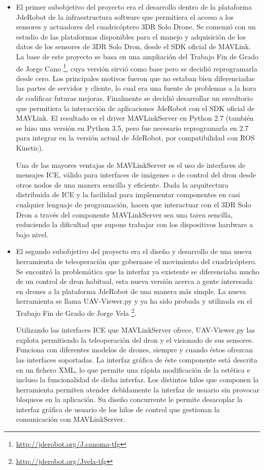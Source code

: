 \begin{itemize}
\item El primer subobjetivo del proyecto era el desarrollo dentro de la plataforma JdeRobot de la infraestructura software que permitiera el acceso a los sensores y actuadores del cuadricóptero 3DR Solo Drone. Se comenzó con un estudio de las plataformas disponibles para el manejo y adquisición de los datos de los sensores de 3DR Solo Dron, desde el SDK oficial de MAVLink. La base de este proyecto se basa en una ampliación del Trabajo Fin de Grado de Jorge Cano \footnote{\url{http://jderobot.org/J.canoma-tfg}}, cuya versión sirvió como base pero se decidió reprogramarla desde cero. Los principales motivos fueron que no estaban bien diferenciadas las partes de servidor y cliente, lo cual era una fuente de problemas a la hora de codificar futuras mejoras. Finalmente se decidió desarrollar un envoltorio que permitiera la interacción de aplicaciones JdeRobot con el SDK oficial de MAVLink. El resultado es el driver MAVLinkServer en Python 2.7 (también se hizo una versión en Python 3.5, pero fue necesario reprogramarla en 2.7 para integrar en la versión actual de JdeRobot, por compatibilidad con ROS Kinetic). 

Una de las mayores ventajas de MAVLinkServer es el uso de interfaces de mensajes ICE, válido para interfaces de imágenes o de control del dron desde otros nodos de una manera sencilla y eficiente. Dada la arquitectura distribuida de ICE y la facilidad para implementar componentes en casi cualquier lenguaje de programación, hacen que interactuar con el 3DR Solo Dron a través del componente MAVLinkServer sea una tarea sencilla, reduciendo la dificultad que supone trabajar con los dispositivos hardware a bajo nivel.

\item El segundo subobjetivo del proyecto era el diseño y desarrollo de una nueva herramienta de teleoperación que gobernase el movimiento del cuadricóptero. Se encontró la problemática que la interfaz ya existente se diferenciaba mucho de un control de dron habitual, esta nueva versión acerca a gente interesada en drones a la plataforma JdeRobot de una manera más simple. La nueva herramienta se llama UAV-Viewer.py y ya ha sido probada y utilizada en el Trabajo Fin de Grado de Jorge Vela \footnote{\url{http://jderobot.org/Jvela-tfg}}\cite{jorgeVela}.

Utilizando las interfaces ICE que MAVLinkServer ofrece, UAV-Viewer.py las explota permitiendo la teleoperación del dron y el visionado de sus sensores. Funciona con diferentes modelos de drones, siempre y cuando éstos ofrezcan las interfaces soportadas. La interfaz gráfica de éste componente está descrita en un fichero XML, lo que permite una rápida modificación de la estética e incluso la funcionalidad de dicha interfaz. Los distintos hilos que componen la herramienta permiten atender debidamente la interfaz de usuario sin provocar bloqueos en la aplicación. Su diseño concurrente le permite desacoplar la interfaz gráfica de usuario de los hilos de control que gestionan la comunicación con MAVLinkServer.


\end{itemize}
